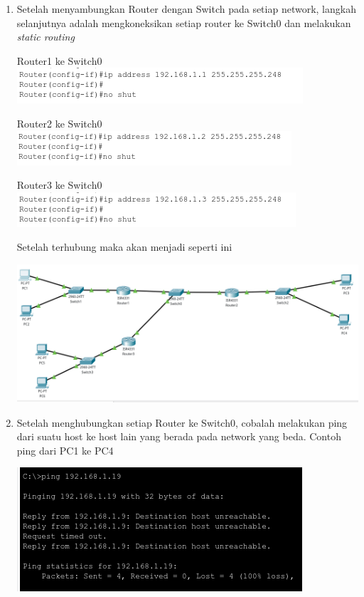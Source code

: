 \documentclass{article}
\begin{document}
\begin{flushleft}
\begin{enumerate}
            \item Setelah menyambungkan Router dengan Switch pada setiap network, langkah selanjutnya adalah mengkoneksikan setiap router ke Switch0 dan melakukan \textit{static routing}
            
            Router1 ke Switch0
            \includegraphics[]{1-8.png}

            Router2 ke Switch0
            \includegraphics[]{1-9.png}

            Router3 ke Switch0
            \includegraphics[]{1-10.png}

            Setelah terhubung maka akan menjadi seperti ini

            \includegraphics[scale=0.3]{1-11.png}

            \item Setelah menghubungkan setiap Router ke Switch0, cobalah melakukan ping dari suatu host ke host lain yang berada pada network yang beda. Contoh ping dari PC1 ke PC4
            
            \includegraphics[scale=0.7]{1-12.png}


\end{enumerate}
\end{flushleft}
\end{document}

